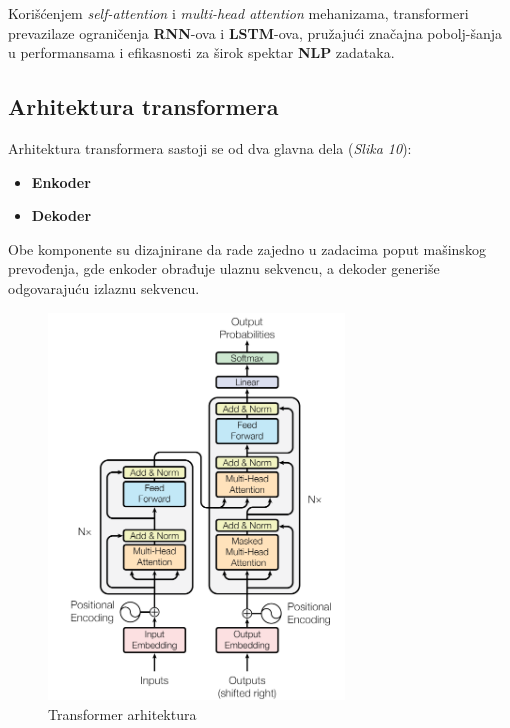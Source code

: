 \documentclass[12pt]{article}
\begin{document}
   Korišćenjem \textit{self-attention} i \textit{multi-head attention} mehanizama, transformeri 
   prevazilaze ograničenja \textbf{RNN}-ova i \textbf{LSTM}-ova, pružajući značajna 
   pobolj-šanja u performansama i efikasnosti za širok spektar \textbf{NLP} zadataka.

   \subsection{Arhitektura transformera}

   Arhitektura transformera sastoji se od dva glavna dela (\textit{Slika 10}):
   \begin{itemize}
      \item \textbf{Enkoder} 
      \item \textbf{Dekoder}
   \end{itemize}
   Obe komponente su dizajnirane da rade zajedno u zadacima poput mašinskog prevođenja, 
   gde enkoder obrađuje ulaznu sekvencu, a dekoder generiše odgovarajuću izlaznu sekvencu. 

   \newpage
   
   \begin{figure}[h!]
      \centering
      \vspace{-1cm} %
      \includegraphics[width=0.7\textwidth]{transformer.png}
      \caption{Transformer arhitektura \cite{attentionneed}}
      \label{fig:transformer}
   \end{figure}
\end{document}
